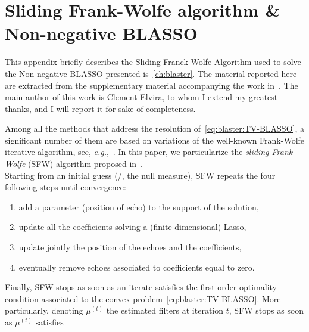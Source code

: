\chapter{Sliding Frank-Wolfe algorithm \& Non-negative BLASSO}\label{ap:blaster}

\vspace{-2.5em}
  This appendix briefly describes the Sliding Franck-Wolfe Algorithm used to solve the Non-negative \ac{BLASSO} presented is~\cref{ch:blaster}.
The material reported here are extracted from the supplementary material accompanying the work in~.
The main author of this work is Clement Elvira, to whom I extend my greatest thanks, and I will report it for sake of completeness.

\mynewline
Among all the methods that address the resolution of~\eqref{eq:blaster:TV-BLASSO}, a significant number of them are based on variations of the well-known Frank-Wolfe iterative algorithm, see, \textit{e.g.},~.
In this paper, we particularize the \emph{sliding Frank-Wolfe} (SFW) algorithm proposed in~.
\\Starting from an initial guess (\eg/, the null measure), SFW repeats the four following steps until convergence:
\begin{enumerate}
	\item add a parameter (position of echo) to the support of the solution,
	\item update all the coefficients solving a (finite dimensional) Lasso,
	\item update jointly the position of the echoes  and the coefficients,
	\item eventually remove echoes associated to coefficients equal to zero.
\end{enumerate}
Finally, SFW stops as soon as an iterate satisfies the first order optimality condition associated to the convex problem~\eqref{eq:blaster:TV-BLASSO}.
More particularly, denoting $\mu^{(t)}$ the estimated filters at iteration $t$, SFW stops as soon as $\mu^{(t)}$ satisfies~


